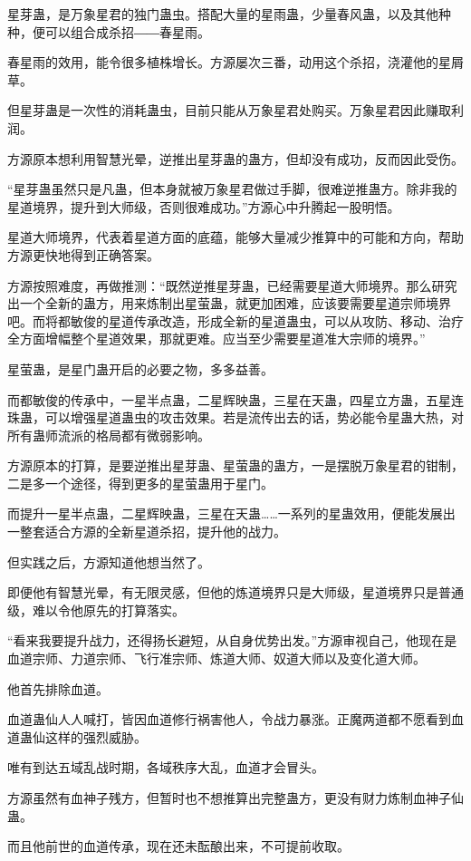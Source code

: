 \begin{this_body}
星芽蛊，是万象星君的独门蛊虫。搭配大量的星雨蛊，少量春风蛊，以及其他种种，便可以组合成杀招――春星雨。

春星雨的效用，能令很多植株增长。方源屡次三番，动用这个杀招，浇灌他的星屑草。

但星芽蛊是一次性的消耗蛊虫，目前只能从万象星君处购买。万象星君因此赚取利润。

方源原本想利用智慧光晕，逆推出星芽蛊的蛊方，但却没有成功，反而因此受伤。

“星芽蛊虽然只是凡蛊，但本身就被万象星君做过手脚，很难逆推蛊方。除非我的星道境界，提升到大师级，否则很难成功。”方源心中升腾起一股明悟。

星道大师境界，代表着星道方面的底蕴，能够大量减少推算中的可能和方向，帮助方源更快地得到正确答案。

方源按照难度，再做推测：“既然逆推星芽蛊，已经需要星道大师境界。那么研究出一个全新的蛊方，用来炼制出星萤蛊，就更加困难，应该要需要星道宗师境界吧。而将都敏俊的星道传承改造，形成全新的星道蛊虫，可以从攻防、移动、治疗全方面增幅整个星道效果，那就更难。应当至少需要星道准大宗师的境界。”

星萤蛊，是星门蛊开启的必要之物，多多益善。

而都敏俊的传承中，一星半点蛊，二星辉映蛊，三星在天蛊，四星立方蛊，五星连珠蛊，可以增强星道蛊虫的攻击效果。若是流传出去的话，势必能令星蛊大热，对所有蛊师流派的格局都有微弱影响。

方源原本的打算，是要逆推出星芽蛊、星萤蛊的蛊方，一是摆脱万象星君的钳制，二是多一个途径，得到更多的星萤蛊用于星门。

而提升一星半点蛊，二星辉映蛊，三星在天蛊……一系列的星蛊效用，便能发展出一整套适合方源的全新星道杀招，提升他的战力。

但实践之后，方源知道他想当然了。

即便他有智慧光晕，有无限灵感，但他的炼道境界只是大师级，星道境界只是普通级，难以令他原先的打算落实。

“看来我要提升战力，还得扬长避短，从自身优势出发。”方源审视自己，他现在是血道宗师、力道宗师、飞行准宗师、炼道大师、奴道大师以及变化道大师。

他首先排除血道。

血道蛊仙人人喊打，皆因血道修行祸害他人，令战力暴涨。正魔两道都不愿看到血道蛊仙这样的强烈威胁。

唯有到达五域乱战时期，各域秩序大乱，血道才会冒头。

方源虽然有血神子残方，但暂时也不想推算出完整蛊方，更没有财力炼制血神子仙蛊。

而且他前世的血道传承，现在还未酝酿出来，不可提前收取。


\end{this_body}
